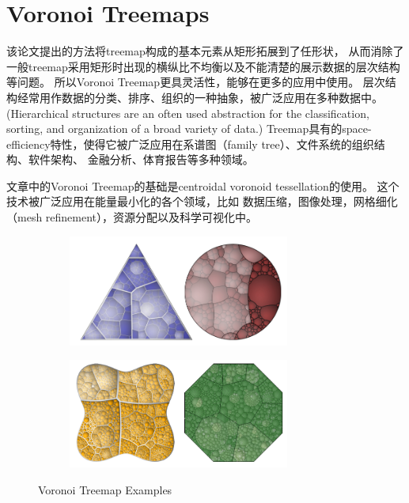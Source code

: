 \documentclass{article}
\begin{document}
\section{Voronoi Treemaps\cite{Balzer2005}}
	该论文提出的方法将treemap构成的基本元素从矩形拓展到了任形状，
	从而消除了一般treemap采用矩形时出现的横纵比不均衡以及不能清楚的展示数据的层次结构等问题。
	所以Voronoi Treemap更具灵活性，能够在更多的应用中使用。
	层次结构经常用作数据的分类、排序、组织的一种抽象，被广泛应用在多种数据中。
	(Hierarchical structures are an often used abstraction for the classification, 
	sorting, and organization of a broad variety of data.)
	Treemap具有的space-efficiency特性，使得它被广泛应用在系谱图（family tree）、文件系统的组织结构、软件架构、
	金融分析、体育报告等多种领域。

	文章中的Voronoi Treemap的基础是centroidal voronoid tessellation\cite{du1999centroidal}的使用。
	这个技术被广泛应用在能量最小化的各个领域，比如
	数据压缩，图像处理，网格细化（mesh refinement），资源分配以及科学可视化中。
	\begin{figure}
		\centering
		\begin{subfigure}[h]{0.5\textwidth}
			\includegraphics[width=0.8\textwidth]{_img/VoronoiTreemap_1.png}
			\label{fig:voronoi_treemap_1}
		\end{subfigure}

		\begin{subfigure}[h]{0.5\textwidth}
			\includegraphics[width=0.8\textwidth]{_img/VoronoiTreemap_2.png}
			\label{fig:voronoi_treemap_2}
		\end{subfigure}
		\caption{Voronoi Treemap Examples}
	\end{figure}
\end{document}
